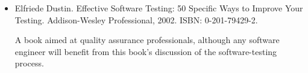 \begin{itemize}
\item
Elfriede Dustin. Effective Software Testing: 50 Specific Ways to Improve Your Testing. Addison-Wesley Professional, 2002. ISBN: 0-201-79429-2.

A book aimed at quality assurance professionals, although any software engineer will benefit from this book’s discussion of the software-testing process.
\end{itemize}